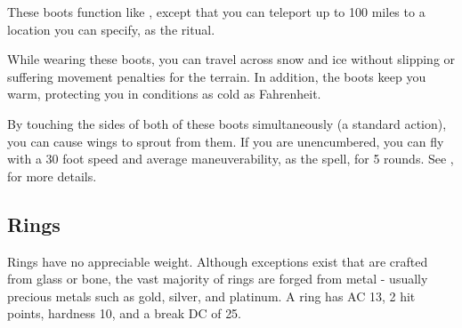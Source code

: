  These boots function like , except that you can teleport up to 100 miles to a location you can specify, as the  ritual.


 While wearing these boots, you can travel across snow and ice without slipping or suffering movement penalties for the terrain. In addition, the boots keep you warm, protecting you in conditions as cold as  Fahrenheit.


 By touching the sides of both of these boots simultaneously (a standard action), you can cause wings to sprout from them. If you are unencumbered, you can fly with a 30 foot speed and average maneuverability, as the  spell, for 5 rounds. See , for more details.


\subsection{Rings}

 Rings have no appreciable weight. Although exceptions exist that are crafted from glass or bone, the vast majority of rings are forged from metal - usually precious metals such as gold, silver, and platinum. A ring has AC 13, 2 hit points, hardness 10, and a break DC of 25.

